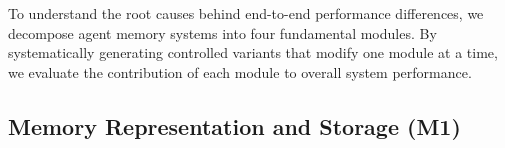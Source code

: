 \documentclass{llmxive}
\begin{document}
To understand the root causes behind end-to-end performance differences, we decompose agent memory systems into four fundamental modules.
By systematically generating controlled variants that modify one module at a time, we evaluate the contribution of each module to overall system performance.

\subsection{Memory Representation and Storage (M1)}
\label{subsec:representation}



\begin{table}[!t]
\centering
\footnotesize
\setlength{\tabcolsep}{4.0pt}
\caption{Ablation of Representation and Storage Mechanisms.}
\label{tab:m1}
\end{table}
\end{document}
